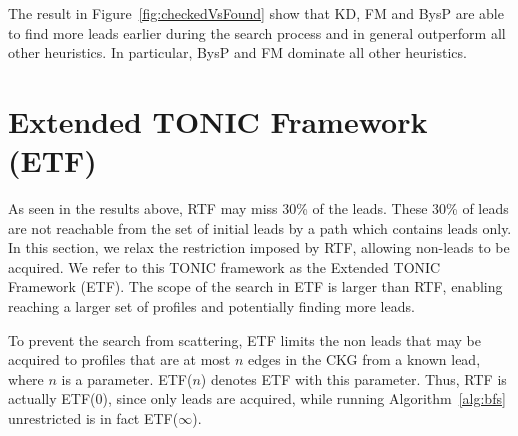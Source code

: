 \documentclass[journal]{IEEEtran}
\newcommand{\islead}[1]{{\em IsLead(#1)}}
\newcommand{\acquire}[1]{{\em Acquire(#1)}}
\begin{document}


The result in Figure~\ref{fig:checkedVsFound} show that KD, FM and BysP are able to find more leads earlier during the search process and in general outperform all other heuristics. In particular, BysP and FM dominate all other heuristics. %


\section{Extended TONIC Framework (ETF)}
\label{sec:etf}



As seen in the results above, RTF may miss 30\% of the leads. These 30\% of leads are not reachable from the set of initial leads by a path which contains leads only. In this section, we relax the restriction imposed by RTF, allowing non-leads to be acquired. We refer to this TONIC framework as the Extended TONIC Framework (ETF). The scope of the search in ETF is larger than RTF, enabling reaching a larger set of profiles and potentially finding more leads. %


To prevent the search from scattering, ETF limits the non leads that may be acquired to profiles that are at most $n$ edges in the CKG from a known lead, where $n$ is a parameter. ETF($n$) denotes ETF with this parameter. Thus, RTF is actually ETF(0), since only leads are acquired, while running Algorithm~\ref{alg:bfs} unrestricted is in fact ETF($\infty$). 
\end{document}
